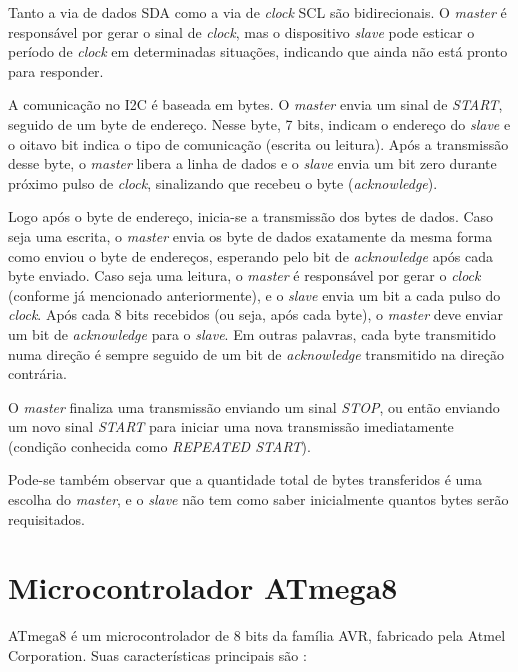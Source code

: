 \documentclass[brazil,pagestart=firstchapter]{abnt}
\begin{document}
Tanto a via de dados \ac{SDA} como a via de \textit{clock} \ac{SCL} são
bidirecionais. O \textit{master} é responsável por gerar o sinal de
\textit{clock}, mas o dispositivo \textit{slave} pode esticar o período de
\textit{clock} em determinadas situações, indicando que ainda não está
pronto para responder. \cite[p.~13]{UM10204}

A comunicação no \ac{I2C} é baseada em bytes. O \textit{master} envia um
sinal de \textit{START}, seguido de um byte de endereço. Nesse byte, 7 bits,
indicam o endereço do \textit{slave} e o oitavo bit indica o tipo de
comunicação (escrita ou leitura). Após a transmissão desse byte, o
\textit{master} libera a linha de dados e o \textit{slave} envia um bit zero
durante próximo pulso de \textit{clock}, sinalizando que recebeu o byte
(\textit{acknowledge}). \cite[p.~3]{AVR315}

Logo após o byte de endereço, inicia-se a transmissão dos bytes de dados.
Caso seja uma escrita, o \textit{master} envia os byte de dados exatamente
da mesma forma como enviou o byte de endereços, esperando pelo bit de
\textit{acknowledge} após cada byte enviado. Caso seja uma leitura, o
\textit{master} é responsável por gerar o \textit{clock} (conforme já
mencionado anteriormente), e o \textit{slave} envia um bit a cada pulso do
\textit{clock}. Após cada 8 bits recebidos (ou seja, após cada byte), o
\textit{master} deve enviar um bit de \textit{acknowledge} para o
\textit{slave}. Em outras palavras, cada byte transmitido numa direção é
sempre seguido de um bit de \textit{acknowledge} transmitido na direção
contrária. \cite[p.~3]{AVR315}

O \textit{master} finaliza uma transmissão enviando um sinal \textit{STOP},
ou então enviando um novo sinal \textit{START} para iniciar uma nova
transmissão imediatamente (condição conhecida como \textit{REPEATED START}).
\cite[p.~158]{ATmega8}

Pode-se também observar que a quantidade total de bytes transferidos é uma
escolha do \textit{master}, e o \textit{slave} não tem como saber
inicialmente quantos bytes serão requisitados.


\section{Microcontrolador ATmega8\label{sec:atmega8}}

ATmega8 é um microcontrolador de 8 bits da família AVR, fabricado pela Atmel
Corporation. Suas características principais são \cite{ATmega8}:
\end{document}
